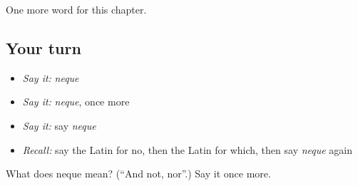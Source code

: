 \begin{grammarlens}[title={What you've built}]
One more word for this chapter.
\end{grammarlens}

\subsection*{Your turn}
\begin{itemize}
\raggedright
  \item \emph{Say it:} \emph{neque}
  \item \emph{Say it:} \emph{neque}, once more
  \item \emph{Say it:} say \emph{neque}
  \item \emph{Recall:} say the Latin for no, then the Latin for which, then say \emph{neque} again
\end{itemize}

\begin{tcolorbox}[breakable,colback=teal!4,colframe=teal!35!black,title={Before you move on}]
What does neque mean? (\textquotedblleft{}And not, nor\textquotedblright{}.) Say it once more.
\end{tcolorbox}

